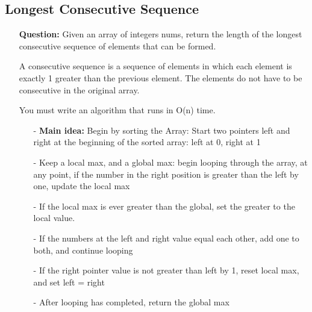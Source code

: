 \documentclass[12pt]{article}
\begin{document}
\subsection{Longest Consecutive Sequence}
\begin{enumerate}
  \item[] \textbf{Question:} Given an array of integers nums, return the length of the longest consecutive sequence of elements that can be formed.

A consecutive sequence is a sequence of elements in which each element is exactly 1 greater than the previous element. The elements do not have to be consecutive in the original array.

You must write an algorithm that runs in O(n) time.


    \begin{enumerate}
      \item[-] \textbf{Main idea: } Begin by sorting the Array: Start two pointers left and right at the beginning of the sorted array: left at 0, right at 1
      \item[-] Keep a local max, and a global max: begin looping through the array, at any point, if the number in the right position is greater than the left by one, update the local max
      \item[-] If the local max is ever greater than the global, set the greater to the local value.
      \item[-] If the numbers at the left and right value equal each other, add one to both, and continue looping

      \item[-] If the right pointer value is not greater than left by 1, reset local max, and set left = right
      \item[-] After looping has completed, return the global max

    \end{enumerate}
\end{enumerate}
\end{document}
